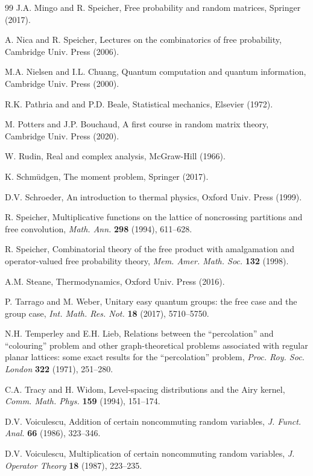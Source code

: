 \documentclass[12pt]{amsbook}
\begin{document}
\begin{thebibliography}{99}
J.A. Mingo and R. Speicher, Free probability and random matrices, Springer (2017).

A. Nica and R. Speicher, Lectures on the combinatorics of free probability, Cambridge Univ. Press (2006).

M.A. Nielsen and I.L. Chuang, Quantum computation and quantum information, Cambridge Univ. Press (2000).

R.K. Pathria and and P.D. Beale, Statistical mechanics, Elsevier (1972).

M. Potters and J.P. Bouchaud, A first course in random matrix theory, Cambridge Univ. Press (2020).

W. Rudin, Real and complex analysis, McGraw-Hill (1966).

K. Schm\"udgen, The moment problem, Springer (2017).

D.V. Schroeder, An introduction to thermal physics, Oxford Univ. Press (1999).

R. Speicher, Multiplicative functions on the lattice of noncrossing partitions and free convolution, {\em Math. Ann.} {\bf 298} (1994), 611--628.

R. Speicher, Combinatorial theory of the free product with amalgamation and operator-valued free probability theory, {\em Mem. Amer. Math. Soc.} {\bf 132} (1998).

A.M. Steane, Thermodynamics, Oxford Univ. Press (2016).

P. Tarrago and M. Weber, Unitary easy quantum groups: the free case and the group case, {\em Int. Math. Res. Not.} {\bf 18} (2017), 5710--5750.

N.H. Temperley and E.H. Lieb, Relations between the ``percolation'' and ``colouring'' problem and other graph-theoretical problems associated with regular planar lattices: some exact results for the ``percolation'' problem, {\em Proc. Roy. Soc. London} {\bf 322} (1971), 251--280.

C.A. Tracy and H. Widom, Level-spacing distributions and the Airy kernel, {\em Comm. Math. Phys.} {\bf 159} (1994), 151--174.

D.V. Voiculescu, Addition of certain noncommuting random variables, {\em J. Funct. Anal.} {\bf 66} (1986), 323--346.

D.V. Voiculescu, Multiplication of certain noncommuting random variables, {\em J. Operator Theory} {\bf 18} (1987), 223--235.


\end{thebibliography}
\end{document}
